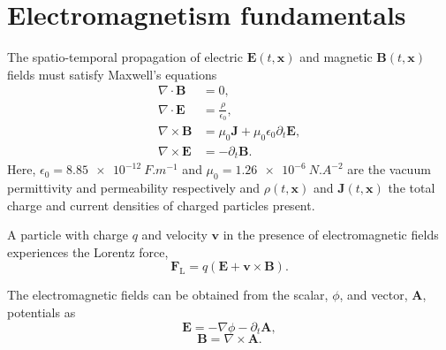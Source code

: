 
\section{Electromagnetism fundamentals}
The spatio-temporal propagation of electric $\mathbf{E}(t,\mathbf{x})$ and magnetic $\mathbf{B}(t,\mathbf{x})$ fields must satisfy Maxwell's equations \cite{chenIntroductionPlasmaPhysics2016}
\begin{subequations}
	\label{eq:intro-maxwell}
	\begin{align}
		\nabla \cdot \mathbf{B} &= 0, \label{eq:intro-B0} \\
		\nabla \cdot \mathbf{E} &= \frac{\rho}{\epsilon_0},\label{eq:intro-E0} \\
		\nabla \times \mathbf{B} &= \mu_0 \mathbf{J} + \mu_0 \epsilon_0 \partial_t \mathbf{E},\label{eq:intro-B1} \\
		\nabla \times \mathbf{E} &=-\partial_t \mathbf{B}. \label{eq:intro-E1}
	\end{align}
\end{subequations}
Here, $\epsilon_0 = \qty{8.85e-12}{F.m^{-1}}$ and $\mu_0 = \qty{1.26e-6}{N.A^{-2}}$ are the vacuum permittivity and permeability respectively and $\rho(t,\mathbf{x})$ and $\mathbf{J}(t,\mathbf{x})$ the total charge and current densities of charged particles present. 

A particle with charge $q$ and velocity $\mathbf{v}$ in the presence of electromagnetic fields experiences the Lorentz force,
\begin{equation}\label{eq:intro-Lorentz_force}
	\mathbf{F}_\mathrm{L} = q(\mathbf{E} + \mathbf{v} \times \mathbf{B}).
\end{equation}

The electromagnetic fields can be obtained from the scalar, $\phi$, and vector, $\mathbf{A}$, potentials as  \cite{steaneRelativityMadeRelatively2012}
\begin{equation}
	\mathbf{E} = -\nabla \phi - \partial_t \mathbf{A},
\end{equation}
\begin{equation}
	\mathbf{B} = \nabla \times \mathbf{A}.
\end{equation}

